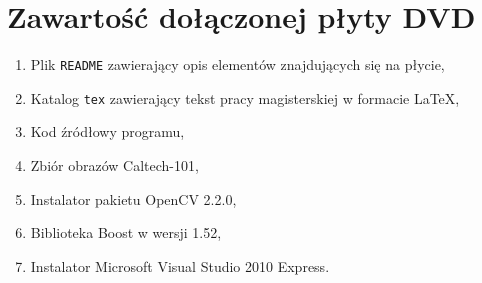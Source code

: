 \chapter{Zawartość dołączonej płyty DVD}

\begin{enumerate}
  \item Plik \texttt{README} zawierający opis elementów znajdujących się na płycie,
  \item Katalog \texttt{tex} zawierający tekst pracy magisterskiej w formacie \LaTeX,
  \item Kod źródłowy programu,
  \item Zbiór obrazów Caltech-101,
  \item Instalator pakietu OpenCV 2.2.0,
  \item Biblioteka Boost w wersji 1.52,
  \item Instalator Microsoft Visual Studio 2010 Express.
\end{enumerate}